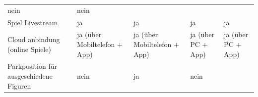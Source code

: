 \begin{longtable}[]{@{}lllll@{}}
\begin{minipage}[t]{0.15\columnwidth}
nein\strut
\end{minipage} & \begin{minipage}[t]{0.13\columnwidth}\raggedright
nein\strut
\end{minipage}\tabularnewline
\begin{minipage}[t]{0.18\columnwidth}\raggedright
Spiel Livestream\strut
\end{minipage} & \begin{minipage}[t]{0.18\columnwidth}\raggedright
ja\strut
\end{minipage} & \begin{minipage}[t]{0.22\columnwidth}\raggedright
ja\strut
\end{minipage} & \begin{minipage}[t]{0.15\columnwidth}\raggedright
ja\strut
\end{minipage} & \begin{minipage}[t]{0.13\columnwidth}\raggedright
ja\strut
\end{minipage}\tabularnewline
\begin{minipage}[t]{0.18\columnwidth}\raggedright
Cloud anbindung (online Spiele)\strut
\end{minipage} & \begin{minipage}[t]{0.18\columnwidth}\raggedright
ja (über Mobiltelefon + App)\strut
\end{minipage} & \begin{minipage}[t]{0.22\columnwidth}\raggedright
ja (über Mobiltelefon + App)\strut
\end{minipage} & \begin{minipage}[t]{0.15\columnwidth}\raggedright
ja (über PC + App)\strut
\end{minipage} & \begin{minipage}[t]{0.13\columnwidth}\raggedright
ja (über PC + App)\strut
\end{minipage}\tabularnewline
\begin{minipage}[t]{0.18\columnwidth}\raggedright
Parkposition für ausgeschiedene Figuren\strut
\end{minipage} & \begin{minipage}[t]{0.18\columnwidth}\raggedright
nein\strut
\end{minipage} & \begin{minipage}[t]{0.22\columnwidth}\raggedright
ja\strut
\end{minipage} & \begin{minipage}[t]{0.15\columnwidth}\raggedright
nein\strut
\end{minipage} & \begin{minipage}[t]{0.13\columnwidth}\raggedright

\end{minipage}
\end{longtable}

